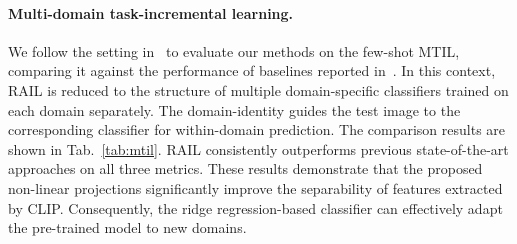 \documentclass{article}
\begin{document}
\paragraph{Multi-domain task-incremental learning.} We follow the setting in~\cite{yu2024boosting} to evaluate our methods on the few-shot MTIL, comparing it against the performance of baselines reported in~\cite{yu2024boosting}. In this context, RAIL is reduced to the structure of multiple domain-specific classifiers trained on each domain separately. The domain-identity guides the test image to the corresponding classifier for within-domain prediction. The comparison results are shown in Tab.~\ref{tab:mtil}. RAIL consistently outperforms previous state-of-the-art approaches on all three metrics. These results demonstrate that the proposed non-linear projections significantly improve the separability of features extracted by CLIP. Consequently, the ridge regression-based classifier can effectively adapt the pre-trained model to new domains.
\end{document}

